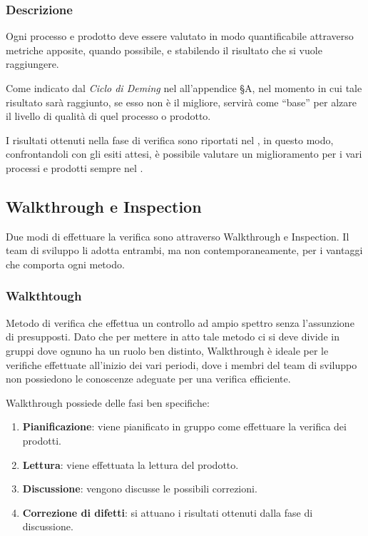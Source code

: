 
		\subsubsection{Descrizione}
		Ogni processo e prodotto deve essere valutato in modo quantificabile attraverso metriche apposite, quando possibile, e stabilendo il risultato che si vuole raggiungere.

		Come indicato dal \textit{Ciclo di Deming} nel \Doc{\PdQv} all'appendice \S A, nel momento in cui tale risultato sarà raggiunto, se esso non è il migliore,
		servirà come ``base'' per alzare il livello di qualità di quel processo o prodotto.

		I risultati ottenuti nella fase di verifica sono riportati nel \PdQ, in questo modo, confrontandoli con gli esiti attesi,
		è possibile valutare un miglioramento per i vari processi e prodotti sempre nel \PdQ.
		
		\subsection{Walkthrough e Inspection}
		Due modi di effettuare la verifica sono attraverso Walkthrough e Inspection. Il team di sviluppo li adotta entrambi, ma non contemporaneamente, per i vantaggi che comporta ogni metodo.
		
			\subsubsection*{Walkthtough}
			Metodo di verifica che effettua un controllo ad ampio spettro senza l’assunzione di presupposti. Dato che per mettere in atto tale metodo ci si deve divide in gruppi dove ognuno ha un ruolo ben distinto, Walkthrough è ideale per le verifiche effettuate all'inizio dei vari periodi, dove i membri del team di sviluppo non possiedono le conoscenze adeguate per una verifica efficiente.
			
			Walkthrough possiede delle fasi ben specifiche:
			
			\begin{enumerate}
				\item \textbf{Pianificazione}: viene pianificato in gruppo come effettuare la verifica dei prodotti.
				\item \textbf{Lettura}: viene effettuata la lettura del prodotto.
				\item \textbf{Discussione}: vengono discusse le possibili correzioni.
				\item \textbf{Correzione di difetti}: si attuano i risultati ottenuti dalla fase di discussione.
			\end{enumerate}
		
